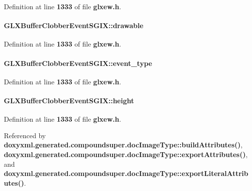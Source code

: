 Definition at line {\bf 1333} of file {\bf glxew.\+h}.

\paragraph[{drawable}]{ G\+L\+X\+Buffer\+Clobber\+Event\+S\+G\+I\+X\+::drawable}\label{structGLXBufferClobberEventSGIX_a9c45674193ed80a79261c3b7518ee04f}


Definition at line {\bf 1333} of file {\bf glxew.\+h}.

\paragraph[{event\+\_\+type}]{ G\+L\+X\+Buffer\+Clobber\+Event\+S\+G\+I\+X\+::event\+\_\+type}\label{structGLXBufferClobberEventSGIX_a0b405123f1d6528f1f4dfa7ff92bde9b}


Definition at line {\bf 1333} of file {\bf glxew.\+h}.

\paragraph[{height}]{ G\+L\+X\+Buffer\+Clobber\+Event\+S\+G\+I\+X\+::height}\label{structGLXBufferClobberEventSGIX_a7838dbabb76c22aa8241310a3f2363ea}


Definition at line {\bf 1333} of file {\bf glxew.\+h}.



Referenced by {\bf doxyxml.\+generated.\+compoundsuper.\+doc\+Image\+Type\+::build\+Attributes()}, {\bf doxyxml.\+generated.\+compoundsuper.\+doc\+Image\+Type\+::export\+Attributes()}, and {\bf doxyxml.\+generated.\+compoundsuper.\+doc\+Image\+Type\+::export\+Literal\+Attributes()}.

